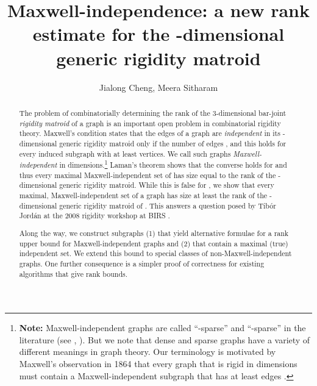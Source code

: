 \documentclass[10pt]{article}
\begin{document}
\title{Maxwell-independence: a new rank estimate for the -dimensional generic rigidity matroid}
\author{Jialong Cheng\footnotemark[1]{  }\footnotemark[2]{}, Meera Sitharam\footnotemark[1]{}}
\date{}


\maketitle

\begin{abstract}
The problem of combinatorially determining the rank of the 3-dimensional
bar-joint {\em rigidity matroid} of a graph is an important open problem in
combinatorial rigidity theory. Maxwell's condition states that the edges of a graph  are {\em independent} in its -dimensional generic rigidity matroid only if  the number of edges   , and  this holds for every induced subgraph with at least  vertices. We call such graphs {\em Maxwell-independent} in  dimensions.\footnote[2]{
{\bf Note:} Maxwell-independent graphs are called ``-sparse''  and ``-sparse'' in the literature (see \cite{JacksonBound2011}, \cite{LeeStreinu2008}). But we note that dense and sparse graphs have a variety of different meanings in graph theory. Our terminology is motivated by Maxwell's observation in 1864 that every graph  that is rigid in  dimensions must contain a Maxwell-independent subgraph that has at least  edges \cite{maxwell:equilibrium:1864}.}
Laman's theorem shows that the converse holds for  and thus every maximal Maxwell-independent set of  has size equal to the  rank of the -dimensional generic rigidity matroid. While this is
false for , we show that every maximal, Maxwell-independent set of a graph  has size at least the rank of the -dimensional generic rigidity matroid of . This answers a question posed by Tib\'or Jord\'an at the 2008 rigidity workshop at BIRS \cite{bib:birs}.

Along the way, we construct subgraphs (1) that yield alternative formulae for a rank upper bound for Maxwell-independent graphs and (2) that contain a maximal (true) independent set. We extend this bound to special classes of non-Maxwell-independent graphs. One further consequence is a simpler proof of
correctness for existing algorithms that give rank bounds.
\end{abstract}
\end{document}
